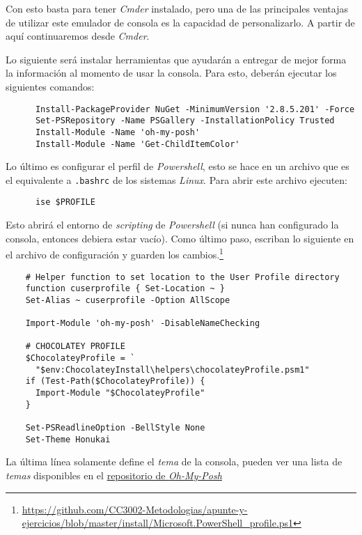     Con esto basta para tener \textit{Cmder} instalado, pero una de las principales ventajas
    de utilizar este emulador de consola es la capacidad de personalizarlo.
    A partir de aquí continuaremos desde \textit{Cmder}.
    
    Lo siguiente será instalar herramientas que ayudarán a entregar de mejor forma la información 
    al momento de usar la consola.
    Para esto, deberán ejecutar los siguientes comandos:

    \begin{verbatim}
      Install-PackageProvider NuGet -MinimumVersion '2.8.5.201' -Force
      Set-PSRepository -Name PSGallery -InstallationPolicy Trusted
      Install-Module -Name 'oh-my-posh'
      Install-Module -Name 'Get-ChildItemColor'
    \end{verbatim}

    Lo último es configurar el perfil de \textit{Powershell}, esto se hace en un archivo que
    es el equivalente a \texttt{.bashrc} de los sistemas \textit{Linux}.
    Para abrir este archivo ejecuten:

    \begin{verbatim}
      ise $PROFILE
    \end{verbatim}

  Esto abrirá el entorno de \textit{scripting} de \textit{Powershell} (si nunca han 
  configurado la consola, entonces debiera estar vacío).
  Como último paso, escriban lo siguiente en el archivo de configuración y guarden los 
  cambios.\footnote{
    \url{https://github.com/CC3002-Metodologias/apunte-y-ejercicios/blob/master/install/Microsoft.PowerShell_profile.ps1}
  }

  \begin{verbatim}
    # Helper function to set location to the User Profile directory
    function cuserprofile { Set-Location ~ }
    Set-Alias ~ cuserprofile -Option AllScope

    Import-Module 'oh-my-posh' -DisableNameChecking

    # CHOCOLATEY PROFILE
    $ChocolateyProfile = `
      "$env:ChocolateyInstall\helpers\chocolateyProfile.psm1"
    if (Test-Path($ChocolateyProfile)) {
      Import-Module "$ChocolateyProfile"
    }

    Set-PSReadlineOption -BellStyle None
    Set-Theme Honukai
  \end{verbatim}

  La última línea solamente define el \textit{tema} de la consola, pueden ver una lista de
  \textit{temas} disponibles en el 
  \href{https://github.com/JanDeDobbeleer/oh-my-posh#themes}{repositorio de \textit{Oh-My-Posh}}

